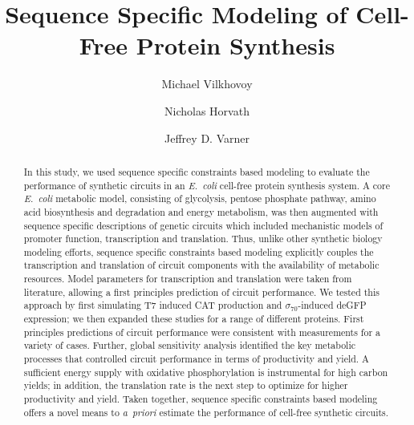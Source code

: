 \documentclass[journal=asbcd6,manuscript=article]{achemso}
\author{Michael Vilkhovoy}
\author{Nicholas Horvath}
\author{Jeffrey D. Varner}
\affiliation[Cornell University]
{Robert Frederick Smith School of Chemical and Biomolecular Engineering, Cornell University, Ithaca, NY 14853}
\title{Sequence Specific Modeling of Cell-Free Protein Synthesis}
\begin{document}
\begin{abstract}
In this study, we used sequence specific constraints based modeling to evaluate the performance of synthetic circuits in an \emph{E.~coli} cell-free protein synthesis system.
A core \emph{E.~coli} metabolic model, consisting of glycolysis, pentose phosphate pathway, amino acid biosynthesis and degradation and energy metabolism, was then augmented with sequence specific descriptions of genetic circuits which included mechanistic models of promoter function, transcription and translation.
Thus, unlike other synthetic biology modeling efforts, sequence specific constraints based modeling explicitly couples the transcription and translation of circuit components with the availability of metabolic resources.
Model parameters for transcription and translation were taken from literature, allowing a first principles prediction of circuit performance.
We tested this approach by first simulating T7 induced CAT production and $\sigma_{70}$-induced deGFP expression; we then expanded these studies for a range of different proteins.
First principles predictions of circuit performance were consistent with measurements for a variety of cases.
Further, global sensitivity analysis identified the key metabolic processes that controlled circuit performance in terms of productivity and yield.
A sufficient energy supply with oxidative phosphorylation is instrumental for high carbon yields; in addition, the translation rate is the next step to optimize for higher productivity and yield.
Taken together, sequence specific constraints based modeling offers a novel means to \emph{a~priori} estimate the performance of cell-free synthetic circuits.
\end{abstract}

\end{document}

